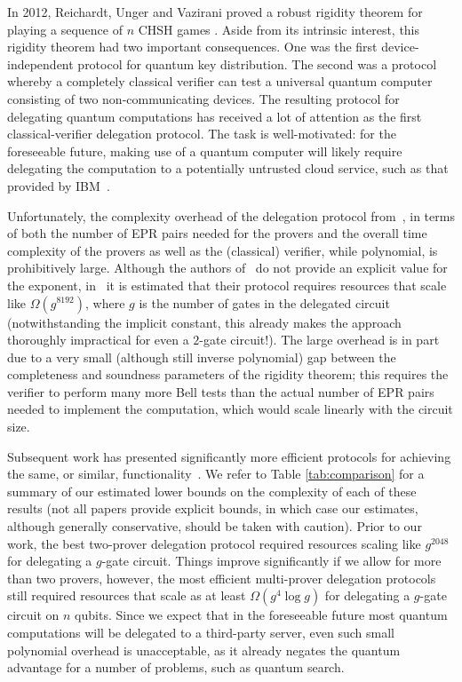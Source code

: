 In 2012, Reichardt, Unger and Vazirani proved a robust rigidity theorem for
playing a sequence of $n$ CHSH games \cite{reichardt2012classical}. Aside from
its intrinsic interest, this rigidity theorem had two important consequences.
One was the first device-independent protocol for quantum key distribution. The
second was a protocol whereby a completely classical verifier can test a
universal quantum computer consisting of two non-communicating devices.  The resulting
 protocol for delegating quantum
computations has received a lot of attention as the first classical-verifier delegation protocol. 
The task is well-motivated: for the foreseeable future, making use of a quantum computer will likely require delegating the computation to a potentially untrusted cloud service, such as that provided by IBM~\cite{ibmcloud}.  

Unfortunately, the complexity overhead of the delegation protocol from~\cite{reichardt2012classical}, in terms of both the number of EPR pairs needed for the provers and the overall time complexity of the provers as well as the (classical) verifier, while polynomial, is prohibitively large. Although the authors of~\cite{reichardt2012classical} do not provide an explicit value for the exponent, in~\cite{hajdusek2015} it is estimated that their protocol requires resources that scale like $\Omega(g^{8192})$, where $g$ is the number of gates in the delegated circuit (notwithstanding the implicit constant, this already makes the approach thoroughly impractical for even a $2$-gate circuit!).
The large overhead is in part due to a very small (although still inverse polynomial) gap between the completeness and soundness parameters of the rigidity theorem; this requires the verifier to perform many more Bell tests than the actual number of EPR pairs needed to implement the computation, which would scale linearly with the circuit size. 

Subsequent work has presented significantly more efficient protocols for achieving the same, or similar,  functionality~\cite{McKague16,Gheorghiu15,hajdusek2015}. We refer to Table \ref{tab:comparison}
for a summary of our estimated lower bounds on the complexity of each of these
results (not all papers provide explicit bounds, in which case our estimates,
although generally conservative, should be taken with caution). Prior to our
work, the best two-prover delegation protocol required resources scaling like
$g^{2048}$ for delegating a $g$-gate circuit. Things improve significantly if we
allow for more than two provers, however, the most efficient multi-prover
delegation protocols still required resources that scale
as at least $\Omega(g^4\log{g})$ for delegating a $g$-gate circuit on $n$ qubits.
Since we expect that in the foreseeable future most quantum computations will be delegated to a third-party server, even such small polynomial overhead is unacceptable, as it already negates the quantum advantage for a number of problems, such as quantum search.

